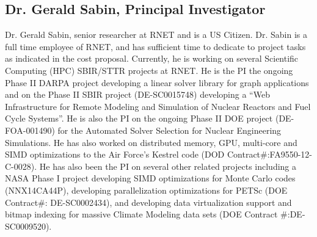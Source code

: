 \subsection{Dr. Gerald Sabin, Principal Investigator}
Dr. Gerald Sabin, senior researcher at RNET and is a US Citizen.  Dr.  Sabin is a full time employee of RNET, and has
sufficient time to dedicate to project tasks as indicated in the cost
proposal. Currently, he is working on several Scientific Computing (HPC) 
SBIR/STTR projects at RNET. He is the PI the 
ongoing Phase II DARPA project developing a linear solver library for graph applications  and on the Phase II SBIR project 
(DE-SC0015748) developing a ``Web Infrastructure for Remote Modeling and
Simulation of Nuclear Reactors and Fuel Cycle Systems''. He is also the PI on the 
ongoing Phase II DOE project (DE-FOA-001490) for the Automated Solver Selection for Nuclear Engineering 
Simulations. He has also worked on distributed memory, GPU, multi-core and SIMD 
optimizations to the Air Force's Kestrel code (DOD Contract\#:FA9550-12-C-0028). He has also been the PI on several other
related projects including a NASA Phase I project developing SIMD
optimizations for Monte Carlo codes (NNX14CA44P), developing
parallelization optimizations for PETSc (DOE Contract\#:
DE-SC0002434), and developing data virtualization support and bitmap
indexing for massive Climate Modeling data sets (DOE Contract
\#:DE-SC0009520).



